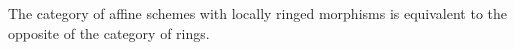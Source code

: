 The category of affine schemes with locally ringed morphisms is equivalent
to the opposite of the category of rings.
